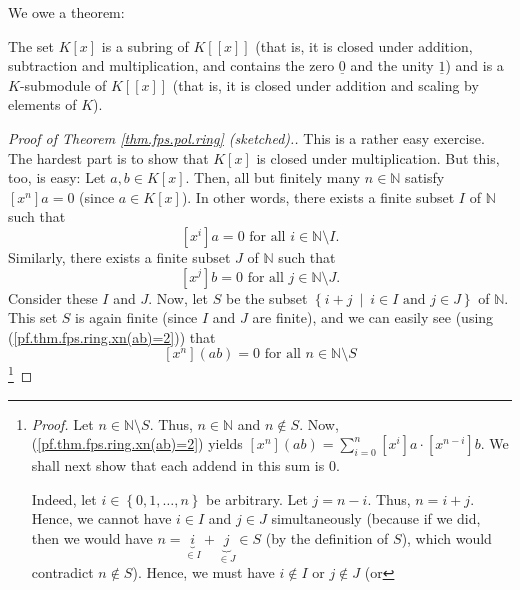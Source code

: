 We owe a theorem:

\begin{theorem}
\label{thm.fps.pol.ring}The set $K\left[  x\right]  $ is a subring of
$K\left[  \left[  x\right]  \right]  $ (that is, it is closed under addition,
subtraction and multiplication, and contains the zero $\underline{0}$ and the
unity $\underline{1}$) and is a $K$-submodule of $K\left[  \left[  x\right]
\right]  $ (that is, it is closed under addition and scaling by elements of
$K$).
\end{theorem}

\begin{proof}
[Proof of Theorem \ref{thm.fps.pol.ring} (sketched).]This is a rather easy
exercise. The hardest part is to show that $K\left[  x\right]  $ is closed
under multiplication. But this, too, is easy: Let $a,b\in K\left[  x\right]
$. Then, all but finitely many $n\in\mathbb{N}$ satisfy $\left[  x^{n}\right]
a=0$ (since $a\in K\left[  x\right]  $). In other words, there exists a finite
subset $I$ of $\mathbb{N}$ such that%
\begin{equation}
\left[  x^{i}\right]  a=0\text{ for all }i\in\mathbb{N}\setminus I.
\label{pf.thm.fps.pol.ring.xia=0}%
\end{equation}
Similarly, there exists a finite subset $J$ of $\mathbb{N}$ such that
\begin{equation}
\left[  x^{j}\right]  b=0\text{ for all }j\in\mathbb{N}\setminus J.
\label{pf.thm.fps.pol.ring.xjb=0}%
\end{equation}
Consider these $I$ and $J$. Now, let $S$ be the subset $\left\{
i+j\ \mid\ i\in I\text{ and }j\in J\right\}  $ of $\mathbb{N}$. This set $S$
is again finite (since $I$ and $J$ are finite), and we can easily see (using
(\ref{pf.thm.fps.ring.xn(ab)=2})) that%
\[
\left[  x^{n}\right]  \left(  ab\right)  =0\text{ for all }n\in\mathbb{N}%
\setminus S
\]
\footnote{\textit{Proof.} Let $n\in\mathbb{N}\setminus S$. Thus,
$n\in\mathbb{N}$ and $n\notin S$. Now, (\ref{pf.thm.fps.ring.xn(ab)=2}) yields
$\left[  x^{n}\right]  \left(  ab\right)  =\sum_{i=0}^{n}\left[  x^{i}\right]
a\cdot\left[  x^{n-i}\right]  b$. We shall next show that each addend in this
sum is $0$.
\par
Indeed, let $i\in\left\{  0,1,\ldots,n\right\}  $ be arbitrary. Let $j=n-i$.
Thus, $n=i+j$. Hence, we cannot have $i\in I$ and $j\in J$ simultaneously
(because if we did, then we would have $n=\underbrace{i}_{\in I}%
+\underbrace{j}_{\in J}\in S$ (by the definition of $S$), which would
contradict $n\notin S$). Hence, we must have $i\notin I$ or $j\notin J$ (or
}
\end{proof}
